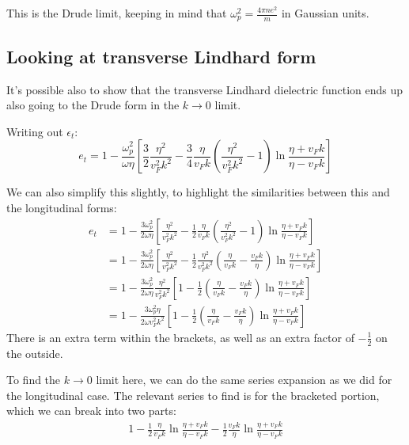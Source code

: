 \documentclass[../../main.tex]{subfiles}
\newcommand{\vf}{v_F}
\begin{document}
This is the Drude limit, keeping in mind that $\omega_p^2 = \frac{4\pi n e^2}{m}$ in Gaussian units.

\subsection{Looking at transverse Lindhard form}
It's possible also to show that the transverse Lindhard dielectric function ends up also going to the Drude form in the $k \rightarrow 0$ limit. 

Writing out $\epsilon_t$:
\begin{equation} 
	e_t = 1 - \frac{\omega_p^2}{\omega \eta} \left[\frac32 \frac{\eta^2}{\vf^2 k^2} - \frac34 \frac{\eta}{\vf k} \left(\frac{\eta^2}{\vf^2 k^2} - 1 \right)\ln\frac{\eta + \vf k}{\eta - \vf k} \right]
\end{equation}

We can also simplify this slightly, to highlight the similarities between this and the longitudinal forms:
\begin{align}
	e_t &= 1 - \frac{3 \omega_p^2}{2\omega \eta} \left[ \frac{\eta^2}{\vf^2 k^2} - \frac12 \frac{\eta}{\vf k} \left(\frac{\eta^2}{\vf^2 k^2} - 1 \right)\ln\frac{\eta + \vf k}{\eta - \vf k} \right] \\
	&= 1 - \frac{3 \omega_p^2}{2\omega \eta} \left[ \frac{\eta^2}{\vf^2 k^2} - \frac12 \frac{\eta^2}{\vf^2 k^2} \left(\frac{\eta}{\vf k} - \frac{\vf k}{\eta} \right)\ln\frac{\eta + \vf k}{\eta - \vf k} \right] \\
	&= 1 - \frac{3 \omega_p^2}{2\omega \eta} \frac{\eta^2}{\vf^2 k^2} \left[ 1 - \frac12 \left(\frac{\eta}{\vf k} - \frac{\vf k}{\eta} \right)\ln\frac{\eta + \vf k}{\eta - \vf k} \right] \\
	&= 1 - \frac{3 \omega_p^2 \eta}{2\omega \vf^2 k^2} \left[ 1 - \frac12 \left(\frac{\eta}{\vf k} - \frac{\vf k}{\eta} \right)\ln\frac{\eta + \vf k}{\eta - \vf k} \right]\label{eq:ReducingLindhard:et}
\end{align}
There is an extra term within the brackets, as well as an extra factor of $-\frac12$ on the outside.

To find the $k \rightarrow 0$ limit here, we can do the same series expansion as we did for the longitudinal case. The relevant series to find is for the bracketed portion, which we can break into two parts:
\begin{align} \label{eq:ReducingLindhard:Simplerft}
	 1 - \frac12 \frac{\eta}{\vf k}\ln\frac{\eta + \vf k}{\eta - \vf k} - \frac12 \frac{\vf k}{\eta}\ln\frac{\eta + \vf k}{\eta - \vf k}
\end{align}
\end{document}
